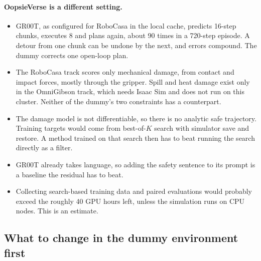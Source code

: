\documentclass[11pt]{article}
\begin{document}
\paragraph{OopsieVerse is a different setting.}
\begin{itemize}
  \item GR00T, as configured for RoboCasa in the local cache, predicts 16-step chunks, executes 8 and
        plans again, about 90 times in a 720-step episode. A detour from one chunk can be undone by the
        next, and errors compound. The dummy corrects one open-loop plan.
  \item The RoboCasa track scores only mechanical damage, from contact and impact forces, mostly through
        the gripper. Spill and heat damage exist only in the OmniGibson track, which needs Isaac Sim and
        does not run on this cluster. Neither of the dummy's two constraints has a counterpart.
  \item The damage model is not differentiable, so there is no analytic safe trajectory. Training
        targets would come from best-of-$K$ search with simulator save and restore. A method trained on
        that search then has to beat running the search directly as a filter.
  \item GR00T already takes language, so adding the safety sentence to its prompt is a baseline the
        residual has to beat.
  \item Collecting search-based training data and paired evaluations would probably exceed the roughly
        40 GPU hours left, unless the simulation runs on CPU nodes. This is an estimate.
\end{itemize}

\subsection{What to change in the dummy environment first}
\end{document}

